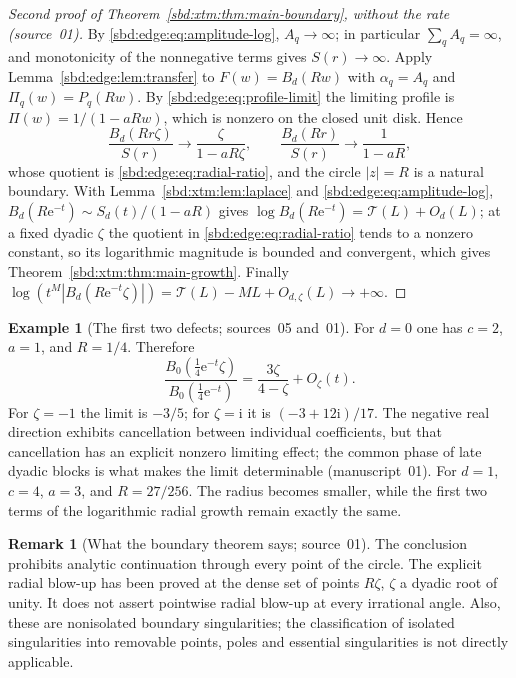 \documentclass[11pt,a4paper]{article}
\theoremstyle{definition}
\newtheorem{example}[theorem]{Example}
\newtheorem{remark}[theorem]{Remark}
\newcommand{\e}{\mathrm e}
\newcommand{\ii}{\mathrm i}
\begin{document}
\begin{proof}[Second proof of Theorem~\ref{sbd:xtm:thm:main-boundary}, without the rate (source~01)]
By \eqref{sbd:edge:eq:amplitude-log}, $A_q\to\infty$; in particular
$\sum_qA_q=\infty$, and monotonicity of the nonnegative terms gives
$S(r)\to\infty$. Apply Lemma~\ref{sbd:edge:lem:transfer} to
$F(w)=B_d(Rw)$ with $\alpha_q=A_q$ and $\Pi_q(w)=P_q(Rw)$. By
\eqref{sbd:edge:eq:profile-limit} the limiting profile is
$\Pi(w)=1/(1-aRw)$, which is nonzero on the closed unit disk. Hence
\[
 \frac{B_d(Rr\zeta)}{S(r)}\longrightarrow\frac{\zeta}{1-aR\zeta},
 \qquad
 \frac{B_d(Rr)}{S(r)}\longrightarrow\frac1{1-aR},
\]
whose quotient is \eqref{sbd:edge:eq:radial-ratio}, and the circle
$|z|=R$ is a natural boundary. With Lemma~\ref{sbd:xtm:lem:laplace} and
\eqref{sbd:edge:eq:amplitude-log}, $B_d(R\e^{-t})\sim S_d(t)/(1-aR)$ gives
$\log B_d(R\e^{-t})=\mathcal T(L)+O_d(L)$; at a fixed dyadic $\zeta$ the
quotient in \eqref{sbd:edge:eq:radial-ratio} tends to a nonzero constant, so
its logarithmic magnitude is bounded and convergent, which gives
Theorem~\ref{sbd:xtm:thm:main-growth}. Finally
$\log(t^M|B_d(R\e^{-t}\zeta)|)=\mathcal T(L)-ML+O_{d,\zeta}(L)\to+\infty$.
\end{proof}

\begin{example}[The first two defects; sources~05 and~01]\label{sbd:xtm:ex:d01}
For $d=0$ one has $c=2$, $a=1$, and $R=1/4$. Therefore
\begin{equation}\label{sbd:xtm:eq:d0-phase}
 \frac{B_0(\tfrac14\e^{-t}\zeta)}{B_0(\tfrac14\e^{-t})}
 =\frac{3\zeta}{4-\zeta}+O_\zeta(t).
\end{equation}
For $\zeta=-1$ the limit is $-3/5$; for $\zeta=\ii$ it is $(-3+12\ii)/17$.
The negative real direction exhibits cancellation between individual
coefficients, but that cancellation has an explicit nonzero limiting
effect; the common phase of late dyadic blocks is what makes the limit
determinable (manuscript~01). For $d=1$, $c=4$, $a=3$, and $R=27/256$. The
radius becomes smaller, while the first two terms of the logarithmic radial
growth remain exactly the same.
\end{example}

\begin{remark}[What the boundary theorem says; source~01]\label{sbd:edge:rem:says}
The conclusion prohibits analytic continuation through every point of the
circle. The explicit radial blow-up has been proved at the dense set of
points $R\zeta$, $\zeta$ a dyadic root of unity. It does not assert
pointwise radial blow-up at every irrational angle. Also, these are
nonisolated boundary singularities; the classification of isolated
singularities into removable points, poles and essential singularities is
not directly applicable.
\end{remark}
\end{document}
